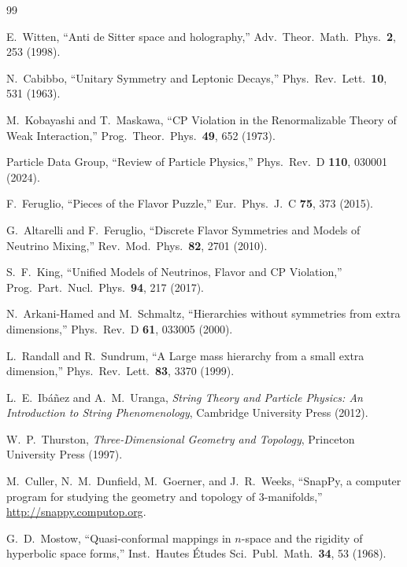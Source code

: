 \documentclass[11pt,a4paper]{article}
\begin{document}
\begin{thebibliography}{99}

E.~Witten,
``Anti de Sitter space and holography,''
Adv.\ Theor.\ Math.\ Phys.\ \textbf{2}, 253 (1998).

N.~Cabibbo,
``Unitary Symmetry and Leptonic Decays,''
Phys.\ Rev.\ Lett.\ \textbf{10}, 531 (1963).

M.~Kobayashi and T.~Maskawa,
``CP Violation in the Renormalizable Theory of Weak Interaction,''
Prog.\ Theor.\ Phys.\ \textbf{49}, 652 (1973).

Particle Data Group,
``Review of Particle Physics,''
Phys.\ Rev.\ D \textbf{110}, 030001 (2024).

F.~Feruglio,
``Pieces of the Flavor Puzzle,''
Eur.\ Phys.\ J.\ C \textbf{75}, 373 (2015).

G.~Altarelli and F.~Feruglio,
``Discrete Flavor Symmetries and Models of Neutrino Mixing,''
Rev.\ Mod.\ Phys.\ \textbf{82}, 2701 (2010).

S.~F.~King,
``Unified Models of Neutrinos, Flavor and CP Violation,''
Prog.\ Part.\ Nucl.\ Phys.\ \textbf{94}, 217 (2017).

N.~Arkani-Hamed and M.~Schmaltz,
``Hierarchies without symmetries from extra dimensions,''
Phys.\ Rev.\ D \textbf{61}, 033005 (2000).

L.~Randall and R.~Sundrum,
``A Large mass hierarchy from a small extra dimension,''
Phys.\ Rev.\ Lett.\ \textbf{83}, 3370 (1999).

L.~E.~Ib\'a\~nez and A.~M.~Uranga,
\emph{String Theory and Particle Physics: An Introduction to String Phenomenology},
Cambridge University Press (2012).

W.~P.~Thurston,
\emph{Three-Dimensional Geometry and Topology},
Princeton University Press (1997).

M.~Culler, N.~M.~Dunfield, M.~Goerner, and J.~R.~Weeks,
``SnapPy, a computer program for studying the geometry and topology 
of 3-manifolds,''
\url{http://snappy.computop.org}.

G.~D.~Mostow,
``Quasi-conformal mappings in $n$-space and the rigidity of hyperbolic 
space forms,''
Inst.\ Hautes \'Etudes Sci.\ Publ.\ Math.\ \textbf{34}, 53 (1968).


\end{thebibliography}
\end{document}
